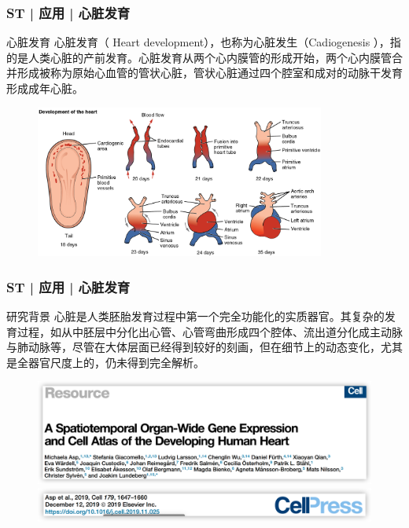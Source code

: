 \documentclass[11pt]{ctexbeamer}
\begin{document}
\begin{frame}
	\frametitle{ST | 应用 | 心脏发育}
		\begin{block}{心脏发育}
			心脏发育（ Heart development），也称为心脏发生（Cadiogenesis ），指的是人类心脏的产前发育。心脏发育从两个心内膜管的形成开始，两个心内膜管合并形成被称为原始心血管的管状心脏，管状心脏通过四个腔室和成对的动脉干发育形成成年心脏。
	\end{block}
	\begin{figure}
		\includegraphics[width=0.85\textwidth]{ST_development_heart_01.png}
	\end{figure}
\end{frame}

\begin{frame}
	\frametitle{ST | 应用 | 心脏发育}
	\begin{block}{研究背景}
		心脏是人类胚胎发育过程中第一个完全功能化的实质器官。其复杂的发育过程，如从中胚层中分化出心管、心管弯曲形成四个腔体、流出道分化成主动脉与肺动脉等，尽管在大体层面已经得到较好的刻画，但在细节上的动态变化，尤其是全器官尺度上的，仍未得到完全解析。
		\end{block}
	\vspace{-0.3em}
		\begin{figure}
		\includegraphics[width=\textwidth]{ST_heart_01.png}\\
		\vspace{-0.6em}
		\includegraphics[width=\textwidth]{ST_heart_02.png}
	\end{figure}
\end{frame}
\end{document}
